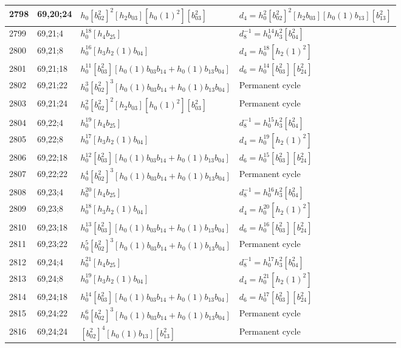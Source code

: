 \documentclass{article}
\begin{document}
\begin{longtable}{|l|l|>{\raggedright\arraybackslash}p{6cm}|>{\raggedright\arraybackslash}p{6cm}|}
\hline
2798 & 69,20;24 & $h_0[b_{02}^2]^2[h_2b_{03}][h_0(1)^2][b_{03}^2]$ &$d_{4}=h_0^2[b_{02}^2]^2[h_2b_{03}][h_0(1)b_{13}][b_{13}^2]$\\
\hline
2799 & 69,21;4 & $h_0^{18}[h_4b_{25}]$ & $d_{8}^{-1}=h_0^{14}h_3^2[b_{04}^2]$\\
\hline
2800 & 69,21;8 & $h_0^{16}[h_3h_2(1)b_{04}]$ &$d_{4}=h_0^{18}[h_2(1)^2]$\\
\hline
2801 & 69,21;18 & $h_0^{11}[b_{03}^2][h_0(1)b_{03}b_{14} + h_0(1)b_{13}b_{04}]$ &$d_{6}=h_0^{14}[b_{03}^2][b_{24}^2]$\\
\hline
2802 & 69,21;22 & $h_0^3[b_{02}^2]^3[h_0(1)b_{03}b_{14} + h_0(1)b_{13}b_{04}]$ & Permanent cycle\\
\hline
2803 & 69,21;24 & $h_0^2[b_{02}^2]^2[h_2b_{03}][h_0(1)^2][b_{03}^2]$ & Permanent cycle\\
\hline
2804 & 69,22;4 & $h_0^{19}[h_4b_{25}]$ & $d_{8}^{-1}=h_0^{15}h_3^2[b_{04}^2]$\\
\hline
2805 & 69,22;8 & $h_0^{17}[h_3h_2(1)b_{04}]$ &$d_{4}=h_0^{19}[h_2(1)^2]$\\
\hline
2806 & 69,22;18 & $h_0^{12}[b_{03}^2][h_0(1)b_{03}b_{14} + h_0(1)b_{13}b_{04}]$ &$d_{6}=h_0^{15}[b_{03}^2][b_{24}^2]$\\
\hline
2807 & 69,22;22 & $h_0^4[b_{02}^2]^3[h_0(1)b_{03}b_{14} + h_0(1)b_{13}b_{04}]$ & Permanent cycle\\
\hline
2808 & 69,23;4 & $h_0^{20}[h_4b_{25}]$ & $d_{8}^{-1}=h_0^{16}h_3^2[b_{04}^2]$\\
\hline
2809 & 69,23;8 & $h_0^{18}[h_3h_2(1)b_{04}]$ &$d_{4}=h_0^{20}[h_2(1)^2]$\\
\hline
2810 & 69,23;18 & $h_0^{13}[b_{03}^2][h_0(1)b_{03}b_{14} + h_0(1)b_{13}b_{04}]$ &$d_{6}=h_0^{16}[b_{03}^2][b_{24}^2]$\\
\hline
2811 & 69,23;22 & $h_0^5[b_{02}^2]^3[h_0(1)b_{03}b_{14} + h_0(1)b_{13}b_{04}]$ & Permanent cycle\\
\hline
2812 & 69,24;4 & $h_0^{21}[h_4b_{25}]$ & $d_{8}^{-1}=h_0^{17}h_3^2[b_{04}^2]$\\
\hline
2813 & 69,24;8 & $h_0^{19}[h_3h_2(1)b_{04}]$ &$d_{4}=h_0^{21}[h_2(1)^2]$\\
\hline
2814 & 69,24;18 & $h_0^{14}[b_{03}^2][h_0(1)b_{03}b_{14} + h_0(1)b_{13}b_{04}]$ &$d_{6}=h_0^{17}[b_{03}^2][b_{24}^2]$\\
\hline
2815 & 69,24;22 & $h_0^6[b_{02}^2]^3[h_0(1)b_{03}b_{14} + h_0(1)b_{13}b_{04}]$ & Permanent cycle\\
\hline
2816 & 69,24;24 & $[b_{02}^2]^4[h_0(1)b_{13}][b_{13}^2]$ & Permanent cycle\\

\end{longtable}
\end{document}

